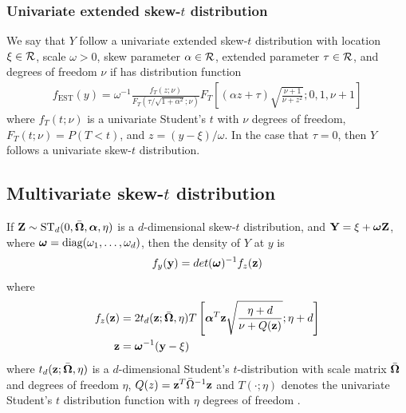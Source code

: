 \documentclass[11pt]{article}
\begin{document}
\subsubsection*{Univariate extended skew-$t$ distribution}
We say that $Y$ follow a univariate extended skew-$t$ distribution with location $\xi \in {\cal R}$, scale $\omega > 0$, skew parameter $\alpha \in {\cal R}$, extended parameter $\tau \in {\cal R}$, and degrees of freedom $\nu$ if has distribution function
\begin{align}
  f_{\text{EST}}(y) = \omega^{-1} \frac{ f_T (z; \nu) }{ F_T(\tau / \sqrt{ 1 + \alpha^2}; \nu)} F_T\left[ (\alpha z + \tau) \sqrt{ \frac{ \nu + 1 }{ \nu + z^2}}; 0, 1, \nu + 1 \right]
\end{align}
where $f_T(t; \nu)$ is a univariate Student's $t$ with $\nu$ degrees of freedom, $F_T(t; \nu) = P(T < t)$, and \hbox{$z = (y - \xi) / \omega$}.
In the case that $\tau = 0$, then $Y$ follows a univariate skew-$t$ distribution.

\subsection*{Multivariate skew-$t$ distribution}
If $\mbox{\bf Z} \sim \text{ST}_d(0, \bar{\mbox{\boldmath $\Omega$}}, \mbox{\boldmath $\alpha$}, \eta)$ is a $d$-dimensional skew-$t$ distribution, and $\mbox{\bf Y} = \xi + \mbox{\boldmath $\omega$} \mbox{\bf Z}$, where $\mbox{\boldmath $\omega$} = \text{diag}(\omega_1, \ldots, \omega_d)$, then the density of $Y$ at $y$ is
\begin{align}
  f_y(\mbox{\bf y}) = det(\mbox{\boldmath $\omega$})^{-1} f_z(\mbox{\bf z})
\end{align}
where
\begin{align}
  f_z(\mbox{\bf z}) &= 2 t_d(\mbox{\bf z}; \bar{\mbox{\boldmath $\Omega$}}, \eta) T \left[ \mbox{\boldmath $\alpha$}^T \mbox{\bf z} \sqrt{ \frac{\eta + d}{\nu + Q(\mbox{\bf z})} }; \eta + d\right] \\
  \mbox{\bf z} &= \mbox{\boldmath $\omega$}^{-1}(\mbox{\bf y} - \xi)
\end{align}
where $t_d(\mbox{\bf z}; \bar{\mbox{\boldmath $\Omega$}}, \eta)$ is a $d$-dimensional Student's $t$-distribution with scale matrix $\bar{\mbox{\boldmath $\Omega$}}$ and degrees of freedom $\eta$, $Q(z) = \mbox{\bf z}^T \bar{\Omega}^{-1}\mbox{\bf z}$ and $T(\cdot; \eta)$ denotes the univariate Student's $t$ distribution function with $\eta$ degrees of freedom \citep{Azzalini2014}.
\end{document}
